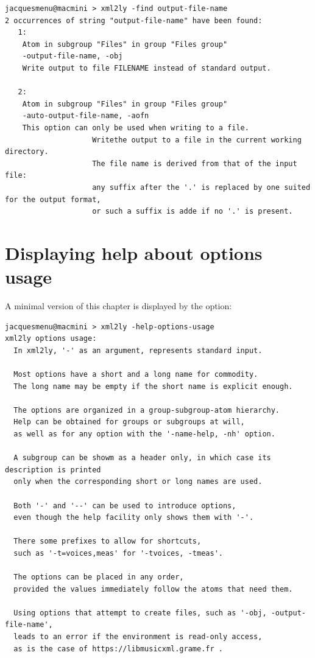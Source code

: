 \begin{lstlisting}[language=Terminal]
jacquesmenu@macmini > xml2ly -find output-file-name
2 occurrences of string "output-file-name" have been found:
   1:
    Atom in subgroup "Files" in group "Files group"
    -output-file-name, -obj
    Write output to file FILENAME instead of standard output.

   2:
    Atom in subgroup "Files" in group "Files group"
    -auto-output-file-name, -aofn
    This option can only be used when writing to a file.
                    Writethe output to a file in the current working directory.
                    The file name is derived from that of the input file:
                    any suffix after the '.' is replaced by one suited for the output format,
                    or such a suffix is adde if no '.' is present.
\end{lstlisting}


\section{Displaying help about options usage}

A minimal version of this chapter is displayed by the  option:
\begin{lstlisting}[language=Terminal]
jacquesmenu@macmini > xml2ly -help-options-usage
xml2ly options usage:
  In xml2ly, '-' as an argument, represents standard input.

  Most options have a short and a long name for commodity.
  The long name may be empty if the short name is explicit enough.

  The options are organized in a group-subgroup-atom hierarchy.
  Help can be obtained for groups or subgroups at will,
  as well as for any option with the '-name-help, -nh' option.

  A subgroup can be showm as a header only, in which case its description is printed
  only when the corresponding short or long names are used.

  Both '-' and '--' can be used to introduce options,
  even though the help facility only shows them with '-'.

  There some prefixes to allow for shortcuts,
  such as '-t=voices,meas' for '-tvoices, -tmeas'.

  The options can be placed in any order,
  provided the values immediately follow the atoms that need them.

  Using options that attempt to create files, such as '-obj, -output-file-name',
  leads to an error if the environment is read-only access,
  as is the case of https://libmusicxml.grame.fr .
\end{lstlisting}


